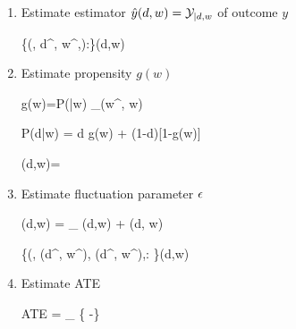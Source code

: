 \begin{enumerate}
\item Estimate estimator ${\hat{y}}(d,w)={\cal Y}_{|d,w}$ of outcome $y$

\beq
\{(\s, d^\s, w^\s,):\s\in \Sigma\}\mlarr \haty(d,w)
\eeq

\item Estimate propensity $g(w)$

\beq
g(w)=P(|w)\approx
{}
{\sum_\s \delta(w^\s, w)}
\eeq

\beq
P(d|w) = d g(w) + (1-d)[1-g(w)]
\eeq

\beq
\beta(d,w)=
\eeq

\item Estimate fluctuation parameter $\epsilon$

\beq
\eta(d,w) =
\underbrace{\logit[\haty(d, w)]}_
{\xi(d,w)}
 + \eps \beta(d, w)
\eeq

\beq
\{(\s, \xi(d^\s, w^\s),
\beta(d^\s, w^\s),:
\s\in \Sigma\}\mlarr \hat{\eta}(d,w)
\eeq

\item Estimate ATE

\beq
ATE =  \sum_\s
\left\{
 \expit[ \hat{\eta}(d=1,w^\s)]
 -\expit[ \hat{\eta}(d=0,w^\s)]
 \right\}
\eeq

\end{enumerate}
